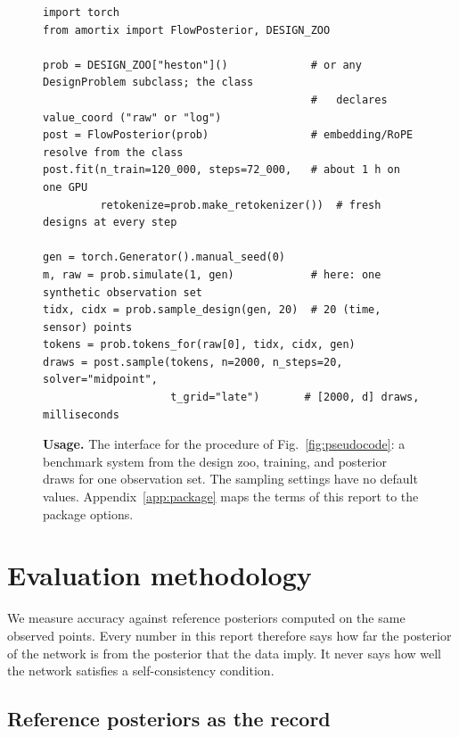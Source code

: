 \documentclass[10pt]{article}
\begin{document}
\begin{figure}[t]
\begin{lstlisting}[style=he]
import torch
from amortix import FlowPosterior, DESIGN_ZOO

prob = DESIGN_ZOO["heston"]()             # or any DesignProblem subclass; the class
                                          #   declares value_coord ("raw" or "log")
post = FlowPosterior(prob)                # embedding/RoPE resolve from the class
post.fit(n_train=120_000, steps=72_000,   # about 1 h on one GPU
         retokenize=prob.make_retokenizer())  # fresh designs at every step

gen = torch.Generator().manual_seed(0)
m, raw = prob.simulate(1, gen)            # here: one synthetic observation set
tidx, cidx = prob.sample_design(gen, 20)  # 20 (time, sensor) points
tokens = prob.tokens_for(raw[0], tidx, cidx, gen)
draws = post.sample(tokens, n=2000, n_steps=20, solver="midpoint",
                    t_grid="late")       # [2000, d] draws, milliseconds
\end{lstlisting}
\caption{\textbf{Usage.} The interface for the procedure of Fig.~\ref{fig:pseudocode}: a benchmark
system from the design zoo, training, and posterior draws for one observation set. The sampling
settings have no default values. Appendix~\ref{app:package} maps the terms of this report to the
package options.}
\label{fig:usage}
\end{figure}

\section{Evaluation methodology}
\label{sec:protocol}

We measure accuracy against reference posteriors computed on the same observed points. Every number in
this report therefore says how far the posterior of the network is from the posterior that the data
imply. It never says how well the network satisfies a self-consistency condition.

\subsection{Reference posteriors as the record}
\label{sec:refs}
\end{document}
